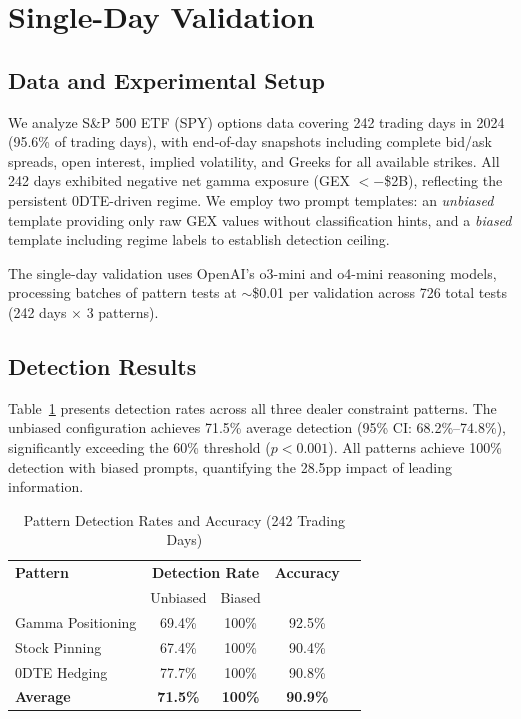 \section{Single-Day Validation}
\label{sec:single_day}

\subsection{Data and Experimental Setup}

We analyze S\&P 500 ETF (SPY) options data covering 242 trading days in 2024 (95.6\% of trading days), with end-of-day snapshots including complete bid/ask spreads, open interest, implied volatility, and Greeks for all available strikes. All 242 days exhibited negative net gamma exposure (GEX $< -$\$2B), reflecting the persistent 0DTE-driven regime. We employ two prompt templates: an \textit{unbiased} template providing only raw GEX values without classification hints, and a \textit{biased} template including regime labels to establish detection ceiling.

The single-day validation uses OpenAI's o3-mini and o4-mini reasoning models, processing batches of pattern tests at $\sim$\$0.01 per validation across 726 total tests (242 days $\times$ 3 patterns).

\subsection{Detection Results}

Table~\ref{tab:detection} presents detection rates across all three dealer constraint patterns. The unbiased configuration achieves 71.5\% average detection (95\% CI: 68.2\%--74.8\%), significantly exceeding the 60\% threshold ($p < 0.001$). All patterns achieve 100\% detection with biased prompts, quantifying the 28.5pp impact of leading information.

\begin{table}[!htbp]
\centering
\caption{Pattern Detection Rates and Accuracy (242 Trading Days)}
\label{tab:detection}
\small
\begin{tabular}{@{}lcccc@{}}
\toprule
\textbf{Pattern} & \multicolumn{2}{c}{\textbf{Detection Rate}} & \textbf{Accuracy} \\
 & Unbiased & Biased & \\
\midrule
Gamma Positioning & 69.4\% & 100\% & 92.5\% \\
Stock Pinning & 67.4\% & 100\% & 90.4\% \\
0DTE Hedging & 77.7\% & 100\% & 90.8\% \\
\midrule
\textbf{Average} & \textbf{71.5\%} & \textbf{100\%} & \textbf{90.9\%} \\
\bottomrule
\end{tabular}
\end{table}

